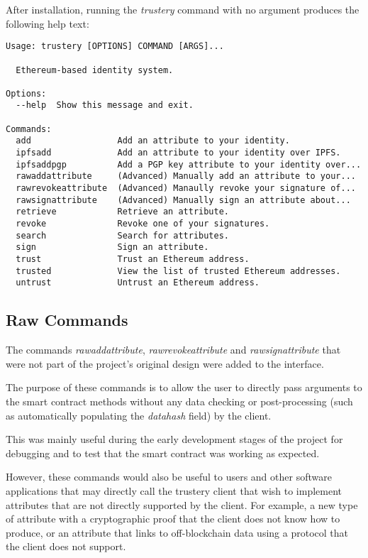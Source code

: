 \documentclass[12pt]{report}
\begin{document}
	After installation, running the \textit{trustery} command with no argument produces the following help text:
	
	\begin{lstlisting}
Usage: trustery [OPTIONS] COMMAND [ARGS]...

  Ethereum-based identity system.

Options:
  --help  Show this message and exit.

Commands:
  add                 Add an attribute to your identity.
  ipfsadd             Add an attribute to your identity over IPFS.
  ipfsaddpgp          Add a PGP key attribute to your identity over...
  rawaddattribute     (Advanced) Manually add an attribute to your...
  rawrevokeattribute  (Advanced) Manaully revoke your signature of...
  rawsignattribute    (Advanced) Manually sign an attribute about...
  retrieve            Retrieve an attribute.
  revoke              Revoke one of your signatures.
  search              Search for attributes.
  sign                Sign an attribute.
  trust               Trust an Ethereum address.
  trusted             View the list of trusted Ethereum addresses.
  untrust             Untrust an Ethereum address.
	\end{lstlisting}
	
	\subsection{Raw Commands}
	The commands \textit{rawaddattribute}, \textit{rawrevokeattribute} and \textit{rawsignattribute} that were not part of the project's original design were added to the interface.
	
	The purpose of these commands is to allow the user to directly pass arguments to the smart contract methods without any data checking or post-processing (such as automatically populating the \textit{datahash} field) by the client.
	
	This was mainly useful during the early development stages of the project for debugging and to test that the smart contract was working as expected.
	
	However, these commands would also be useful to users and other software applications that may directly call the trustery client that wish to implement attributes that are not directly supported by the client. For example, a new type of attribute with a cryptographic proof that the client does not know how to produce, or an attribute that links to off-blockchain data using a protocol that the client does not support.
	
\end{document}
